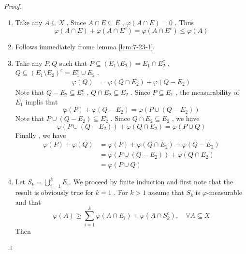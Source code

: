 \documentclass[../main.tex]{subfiles}
\begin{document}
\begin{proof}
    \begin{enumerate}
        \item Take any \(  A\subseteq X  \) . Since \(  A\cap E\subseteq E  \) , \(   \varphi \left( A\cap E \right)= 0   \) .  Thus \[
         \varphi \left( A\cap E \right)+   \varphi \left( A\cap E^{c} \right)=  \varphi \left( A\cap E^{c} \right)\le  \varphi \left( A \right)    
        \]   
        \item Follows immediately frome lemma \ref{lem:7-23-1}.
        \item Take any \(  P,Q  \) such that \(  P\subseteq \left( E_1\setminus E_2 \right) = E_1\cap  E_2^{c}  \) , \(  Q\subseteq \left( E_1\setminus E_2 \right)^{c}= E_1^{c}\cup E_2   \) .   \[
        \begin{aligned}
         \varphi \left( Q \right)&=  \varphi \left( Q\cap E_2 \right)+  \varphi \left( Q-  E_2 \right)
        \end{aligned}   
        \] Note that \(  Q-E_2 \subseteq E_1^{c}  \) , \(  Q\cap E_2\subseteq E_2  \) . Since \(  P\subseteq E_1  \) , the measurability of \(  E_1  \) implis that  \[
         \varphi \left( P \right)+  \varphi \left( Q-E_2 \right)=  \varphi \left( P\cup \left( Q-E_2 \right)  \right)   
        \]  Note that \(  P\cup \left( Q-E_2 \right)\subseteq E_2^{c}   \)  . Since \(  Q\cap E_2\subseteq E_2  \) , we have \[
         \varphi \left( P\cup \left( Q-E_2 \right) \right)+  \varphi \left( Q\cap E_2 \right)=  \varphi \left( P\cup Q \right)   
        \]  Finally , we have \[
        \begin{aligned}
         \varphi \left( P \right)+  \varphi \left( Q \right)&=   \varphi \left( P \right)+  \varphi \left( Q\cap E_2 \right)+  \varphi \left( Q- E_2 \right)\\ 
          &=        \varphi \left( P\cup \left( Q-E_2 \right)  \right)+  \varphi \left( Q\cap E_2 \right)\\ 
           &=  \varphi \left( P\cup Q \right)    
        \end{aligned}
        \]
        \item  Let \(  S_{k} = \bigcup _{i= 1}^{k}E_{i}  \).  We proceed by finite induction and first note that the result is obviously true for \(  k= 1  \) . For \(  k> 1  \) assume that \(  S_{k}  \) is \(   \varphi   \)-measurable and that \[
         \varphi \left( A \right)\ge  \sum _{i = 1}^{k} \varphi \left( A\cap E_{i} \right)+  \varphi \left( A\cap S_{k}^{c} \right)   ,\quad \forall A\subseteq X
        \]   Then \[
\]
\end{enumerate}
\end{proof}
\end{document}

